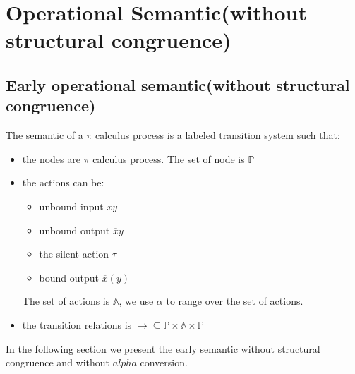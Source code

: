 \section{Operational Semantic(without structural congruence)}
\subsection{Early operational semantic(without structural congruence)}
The semantic of a $\pi$ calculus process is a labeled transition system such that:
\begin{itemize}
  \item 
    the nodes are $\pi$ calculus process. The set of node is $\mathbb{P}$
  \item
    the actions can be:
    \begin{itemize}
      \item unbound input $xy$
      \item unbound output $\overline{x}y$
      \item the silent action $\tau$
      \item bound output $\overline{x}(y)$
    \end{itemize}
    The set of actions is $\mathbb{A}$, we use $\alpha$ to range over the set of actions.
  \item
    the transition relations is $\rightarrow\subseteq \mathbb{P}\times \mathbb{A}\times \mathbb{P}$
\end{itemize}
In the following section we present the early semantic without structural congruence and without $alpha$ conversion. 

